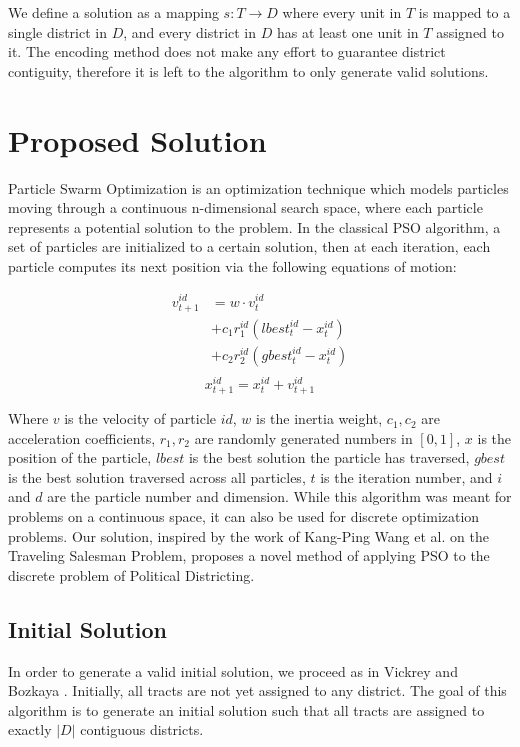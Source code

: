 \documentclass[journal]{IEEEtran}
\begin{document}
We define a solution as a mapping $s: T \rightarrow D$ where every unit in $T$
is mapped to a single district in $D$, and every district in $D$ has at least
one unit in $T$ assigned to it.  The encoding method does not make any effort to
guarantee district contiguity, therefore it is left to the algorithm to only
generate valid solutions.

\section{Proposed Solution}
\label{sec:proposed_solution}
Particle Swarm Optimization is an optimization technique which models particles
moving through a continuous n-dimensional search space, where each particle
represents a potential solution to the problem.  In the classical PSO algorithm,
a set of particles are initialized to a certain solution, then at each
iteration, each particle computes its next position via the following equations
of motion:

\begin{equation}
\label{vel-update-eqn-classic}
\begin{aligned}
v_{t + 1}^{id} &= w \cdot v_t^{id}\\
&+ c_1r_1^{id}(lbest_t^{id} - x_t^{id})\\
&+ c_2r_2^{id}(gbest_t^{id} - x_t^{id})\\
\end{aligned}
\end{equation}
\begin{equation}
\label{pos-update-eqn-classic}
x_{t + 1}^{id} = x_t^{id} + v_{t + 1}^{id}
\end{equation}

Where $v$ is the velocity of particle $id$, $w$ is the inertia weight, $c_1,
c_2$ are acceleration coefficients, $r_1, r_2$ are randomly generated numbers in
$[0, 1]$, $x$ is the position of the particle, $lbest$ is the best solution the
particle has traversed, $gbest$ is the best solution traversed across all
particles, $t$ is the iteration number, and $i$ and $d$ are the particle number
and dimension.  While this algorithm was meant for problems on a continuous
space, it can also be used for discrete optimization problems.  Our solution,
inspired by the work of Kang-Ping Wang et al. \cite{tsp-pso} on the Traveling
Salesman Problem, proposes a novel method of applying PSO to the discrete
problem of Political Districting.  

\subsection{Initial Solution}
In order to generate a valid initial solution, we proceed as in Vickrey
\cite{initial} and Bozkaya \cite{local-search}.  Initially, all tracts are not
yet assigned to any district. The goal of this algorithm is to generate an
initial solution such that all tracts are assigned to exactly $|D|$ contiguous
districts.
\end{document}
